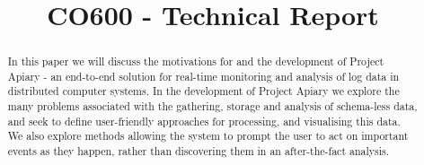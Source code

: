 \documentclass[10pt, a4paper, conference, compsocconf]{IEEEtran}
\begin{document}
%
\title{CO600 - Technical Report}



\author{
  \and
  \and
  \and
}

\maketitle

\newpage

\begin{abstract}
In this paper we will discuss the motivations for and the development of Project
Apiary - an end-to-end solution for real-time monitoring and analysis of log
data in distributed computer systems. In the development of Project Apiary we
explore the many problems associated with the gathering, storage and analysis of
schema-less data, and seek to define user-friendly approaches for processing,
and visualising this data. We also explore methods allowing the system to prompt
the user to act on important events as they happen, rather than discovering them
in an after-the-fact analysis.
\end{abstract}

%

\IEEEpeerreviewmaketitle





















\end{document}
